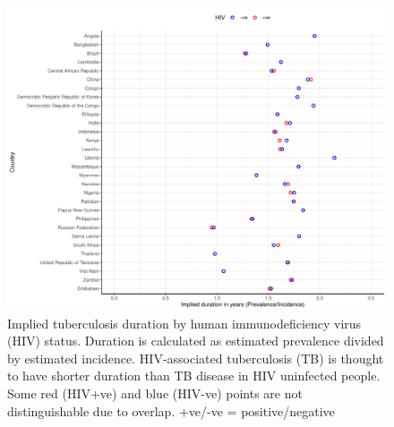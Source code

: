 \documentclass[12pt]{article}
\begin{document}
\begin{figure}
  \centering
  \includegraphics[width=1\textwidth]{../plots/aF7.pdf}
  \caption[Implied duration by HIV status]{Implied tuberculosis duration by human
    immunodeficiency virus (HIV) status.
    Duration is calculated as estimated prevalence divided by estimated
    incidence. HIV-associated tuberculosis (TB) is thought to have shorter duration than TB
    disease in HIV uninfected people. Some red (HIV+ve) and blue (HIV-ve) points are not
    distinguishable due to overlap. +ve/-ve = positive/negative}
\end{figure}


\FloatBarrier
\end{document}
